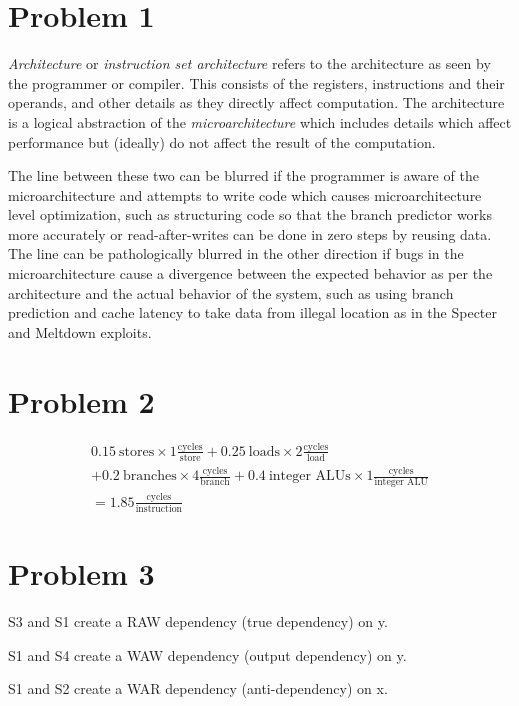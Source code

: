 \documentclass[12pt,letterpaper]{article}
\newcommand{\tf}[2]{\frac{\text{#1}}{\text{#2}}}
\begin{document}
\section*{Problem 1}

\textit{Architecture} or \textit{instruction set architecture} refers to the architecture as seen by
the programmer or compiler. This consists of the registers, instructions and their operands, and
other details as they directly affect computation. The architecture is a logical abstraction of the
\textit{microarchitecture} which includes details which affect performance but (ideally) do not affect
the result of the computation.

The line between these two can be blurred if the programmer is aware of the
microarchitecture and attempts to write code which causes microarchitecture level optimization, such
as structuring code so that the branch predictor works more accurately or read-after-writes can be
done in zero steps by reusing data. The line can be pathologically blurred in the other direction if
bugs in the microarchitecture cause a divergence between the expected behavior as per the
architecture and the actual behavior of the system, such as using branch prediction and cache
latency to take data from illegal location as in the Specter and Meltdown exploits.

\section*{Problem 2}

\begin{multline*}
0.15\ \text{stores} \times 1 \tf{cycles}{store} 
+ 0.25\ \text{loads} \times 2 \tf{cycles}{load}\\
+ 0.2\ \text{branches} \times 4\tf{cycles}{branch} 
+ 0.4\ \text{integer ALUs} \times 1\tf{cycles}{integer ALU}\\ 
=  1.85 \tf{cycles}{instruction}
\end{multline*}

\section*{Problem 3}



S3 and S1 create a RAW dependency (true dependency) on y.

S1 and S4 create a WAW dependency (output dependency) on y.

S1 and S2 create a WAR dependency (anti-dependency) on x.
\end{document}
